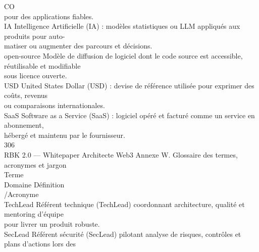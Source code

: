 CO\\
pour des applications fiables.\\
\vspace{0.5em}
IA                                                                           Intelligence Artificielle (IA) : modèles statistiques ou LLM appliqués aux produits pour auto-\\
matiser ou augmenter des parcours et décisions.\\
\vspace{0.5em}
open-source                                                                  Modèle de diffusion de logiciel dont le code source est accessible, réutilisable et modifiable\\
sous licence ouverte.\\
\vspace{0.5em}
USD                                                                          United States Dollar (USD) : devise de référence utilisée pour exprimer des coûts, revenus\\
ou comparaisons internationales.\\
\vspace{0.5em}
SaaS                                                                         Software as a Service (SaaS) : logiciel opéré et facturé comme un service en abonnement,\\
hébergé et maintenu par le fournisseur.\\
\vspace{0.5em}
\vspace{0.5em}
\vspace{0.5em}
\vspace{0.5em}
306\\
RBK 2.0 — Whitepaper Architecte Web3                                               Annexe W. Glossaire des termes, acronymes et jargon\\
\vspace{0.5em}
\vspace{0.5em}
Terme\\
Domaine    Définition\\
/Acronyme\\
TechLead                                Référent technique (TechLead) coordonnant architecture, qualité et mentoring d’équipe\\
pour livrer un produit robuste.\\
\vspace{0.5em}
SecLead                                 Référent sécurité (SecLead) pilotant analyse de risques, contrôles et plans d’actions lors des\\
